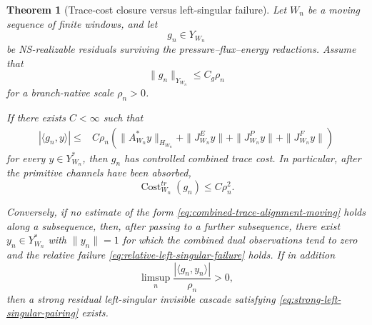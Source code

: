 \documentclass[11pt]{article}
\numberwithin{equation}{section}
\theoremstyle{plain}
\newtheorem{theorem}{Theorem}[section]
\theoremstyle{definition}
\theoremstyle{remark}
\begin{document}
\begin{theorem}[Trace-cost closure versus left-singular failure]
\label{thm:trace-cost-closure-left-singular-clean}
Let \(W_n\) be a moving sequence of finite windows, and let
\[
        g_n\in Y_{W_n}
\]
be NS-realizable residuals surviving the pressure--flux--energy reductions.
Assume that
\begin{equation}
        \|g_n\|_{Y_{W_n}}\le C_g\rho_n
        \label{eq:residual-scale-bound}
\end{equation}
for a branch-native scale \(\rho_n>0\).

If there exists \(C<\infty\) such that
\begin{align}
        |\langle g_n,y\rangle|
        \le{}&
        C\rho_n
        \left(
            \|A_{W_n}^*y\|_{H_{W_n}}
            +
            \|J^E_{W_n}y\|
            +
            \|J^P_{W_n}y\|
            +
            \|J^F_{W_n}y\|
        \right)
        \label{eq:combined-trace-alignment-moving}
\end{align}
for every \(y\in Y_{W_n}^*\), then \(g_n\) has controlled combined trace cost.
In particular, after the primitive channels have been absorbed,
\begin{equation}
        \operatorname{Cost}^{tr}_{W_n}(g_n)
        \le
        C\rho_n^2.
        \label{eq:moving-trace-cost-bound}
\end{equation}

Conversely, if no estimate of the form
\eqref{eq:combined-trace-alignment-moving} holds along a subsequence, then,
after passing to a further subsequence, there exist \(y_n\in Y_{W_n}^*\) with
\(\|y_n\|=1\) for which the combined dual observations tend to zero and the
relative failure \eqref{eq:relative-left-singular-failure} holds.  If in
addition
\[
        \limsup_n\frac{|\langle g_n,y_n\rangle|}{\rho_n}>0,
\]
then a strong residual left-singular invisible cascade satisfying
\eqref{eq:strong-left-singular-pairing} exists.
\end{theorem}
\end{document}
